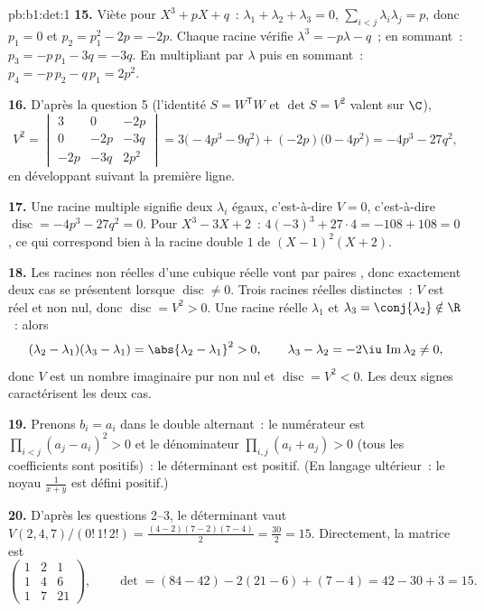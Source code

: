 \begin{solution}{pb:b1:det:1}
\textbf{15.} Viète pour $X^3 + pX + q$~: $\lambda_1 + \lambda_2 +
\lambda_3 = 0$, $\sum_{i<j}\lambda_i\lambda_j = p$, donc $p_1 = 0$
et $p_2 = p_1^2 - 2p = -2p$. Chaque racine vérifie $\lambda^3 =
-p\lambda - q$~; en sommant~: $p_3 = -p\,p_1 - 3q = -3q$. En
multipliant par $\lambda$ puis en sommant~: $p_4 = -p\,p_2 - q\,p_1 =
2p^2$.

\textbf{16.} D'après la question 5 (l'identité $S = W^{\mathsf T}W$
et $\det S = V^2$ valent sur $\C$),
\[
V^2 = \begin{vmatrix}
3 & 0 & -2p\\
0 & -2p & -3q\\
-2p & -3q & 2p^2
\end{vmatrix}
= 3\bigl(-4p^3 - 9q^2\bigr) + (-2p)\bigl(0 - 4p^2\bigr)
= -4p^3 - 27q^2 ,
\]
en développant suivant la première ligne.

\textbf{17.} Une racine multiple signifie deux $\lambda_i$ égaux,
c'est-à-dire $V = 0$, c'est-à-dire $\operatorname{disc} = -4p^3 -
27q^2 = 0$. Pour $X^3 - 3X + 2$~: $4(-3)^3 + 27\cdot4 = -108 + 108 =
0$, ce qui correspond bien à la racine double $1$ de $(X-1)^2(X+2)$.

\textbf{18.} Les racines non réelles d'une cubique réelle vont par
paires , donc exactement deux cas se présentent lorsque
$\operatorname{disc} \neq 0$. Trois racines réelles distinctes~: $V$
est réel et non nul, donc $\operatorname{disc} = V^2 > 0$. Une racine
réelle $\lambda_1$ et $\lambda_3 = \conj{\lambda_2} \notin \R$~: alors
\[
(\lambda_2 - \lambda_1)(\lambda_3 - \lambda_1) =
\abs{\lambda_2 - \lambda_1}^2 > 0,
\qquad
\lambda_3 - \lambda_2 = -2\iu\,\operatorname{Im}\lambda_2 \neq 0,
\]
donc $V$ est un nombre imaginaire pur non nul et
$\operatorname{disc} = V^2 < 0$. Les deux signes caractérisent les
deux cas.

\textbf{19.} Prenons $b_i = a_i$ dans le double alternant~: le
numérateur est $\prod_{i<j}(a_j - a_i)^2 > 0$ et le dénominateur
$\prod_{i,j}(a_i + a_j) > 0$ (tous les coefficients sont positifs)~: le
déterminant est positif. (En langage ultérieur~: le noyau
$\frac1{x+y}$ est défini positif.)

\textbf{20.} D'après les questions 2--3, le déterminant vaut
$V(2,4,7)/(0!\,1!\,2!) = \frac{(4-2)(7-2)(7-4)}{2} =
\frac{30}{2} = 15$. Directement, la matrice est
\[
\begin{pmatrix}
1 & 2 & 1\\
1 & 4 & 6\\
1 & 7 & 21
\end{pmatrix},
\qquad
\det = (84 - 42) - 2(21 - 6) + (7 - 4) = 42 - 30 + 3 = 15 .
\]


\end{solution}
